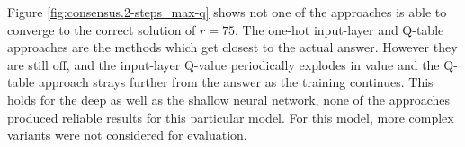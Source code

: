 Figure \ref{fig:consensus.2-steps_max-q} shows not one of the approaches is able to converge to the correct solution of $r = 75$. The one-hot input-layer and Q-table approaches are the methods which get closest to the actual answer. However they are still off, and the input-layer Q-value periodically explodes in value and the Q-table approach strays further from the answer as the training continues. This holds for the deep as well as the shallow neural network, none of the approaches produced reliable results for this particular model. For this model, more complex variants were not considered for evaluation.